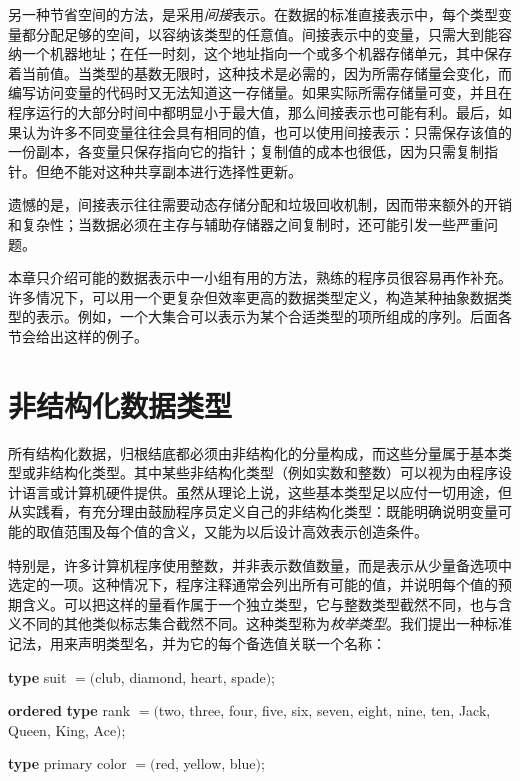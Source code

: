 另一种节省空间的方法，是采用\textit{间接}表示。在数据的标准直接表示中，每个类型变量都分配足够的空间，以容纳该类型的任意值。间接表示中的变量，只需大到能容纳一个机器地址；在任一时刻，这个地址指向一个或多个机器存储单元，其中保存着当前值。当类型的基数无限时，这种技术是必需的，因为所需存储量会变化，而编写访问变量的代码时又无法知道这一存储量。如果实际所需存储量可变，并且在程序运行的大部分时间中都明显小于最大值，那么间接表示也可能有利。最后，如果认为许多不同变量往往会具有相同的值，也可以使用间接表示：只需保存该值的一份副本，各变量只保存指向它的指针；复制值的成本也很低，因为只需复制指针。但绝不能对这种共享副本进行选择性更新。

遗憾的是，间接表示往往需要动态存储分配和垃圾回收机制，因而带来额外的开销和复杂性；当数据必须在主存与辅助存储器之间复制时，还可能引发一些严重问题。

本章只介绍可能的数据表示中一小组有用的方法，熟练的程序员很容易再作补充。许多情况下，可以用一个更复杂但效率更高的数据类型定义，构造某种抽象数据类型的表示。例如，一个大集合可以表示为某个合适类型的项所组成的序列。后面各节会给出这样的例子。
\section[非结构化数据类型]{非结构化数据类型}
\label{sec:unstructured-data-types}

所有结构化数据，归根结底都必须由非结构化的分量构成，而这些分量属于基本类型或非结构化类型。其中某些非结构化类型（例如实数和整数）可以视为由程序设计语言或计算机硬件提供。虽然从理论上说，这些基本类型足以应付一切用途，但从实践看，有充分理由鼓励程序员定义自己的非结构化类型：既能明确说明变量可能的取值范围及每个值的含义，又能为以后设计高效表示创造条件。

特别是，许多计算机程序使用整数，并非表示数值数量，而是表示从少量备选项中选定的一项。这种情况下，程序注释通常会列出所有可能的值，并说明每个值的预期含义。可以把这样的量看作属于一个独立类型，它与整数类型截然不同，也与含义不同的其他类似标志集合截然不同。这种类型称为\textit{枚举类型}。我们提出一种标准记法，用来声明类型名，并为它的每个备选值关联一个名称：
\medskip

\tabto{3.7em}\textbf{type} suit $= ($club, diamond, heart, spade$)$;

\noindent
{}\parindent\textbf{ordered} \tabto{3.7em}\textbf{type} rank $= ($two, three, four, five, six, seven, eight, nine, ten, Jack, Queen, King, Ace$)$;
\medskip

\tabto{3.7em}\textbf{type} primary color $= ($red, yellow, blue$)$;

